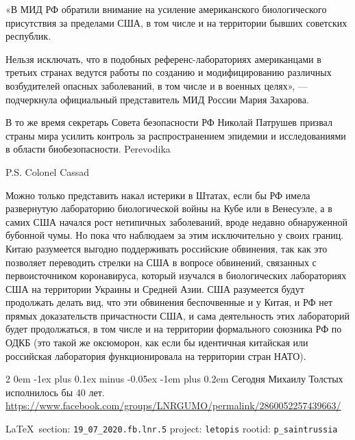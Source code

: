 \documentclass[a4paper,11pt]{extreport}
\makeatletter
\renewcommand\subsection{%
  \clearpage
    \@startsection{subsection}%
    {2}%
    {0em}%
    {-1ex plus 0.1ex minus -0.05ex}%
    {-1em plus 0.2em}%
    {\scshape\bfseries\Large}%
}
\makeatother
\begin{document}
«В МИД РФ обратили внимание на усиление американского биологического
присутствия за пределами США, в том числе и на территории бывших советских
республик.

Нельзя исключать, что в подобных референс-лабораториях американцами в третьих
странах ведутся работы по созданию и модифицированию различных возбудителей
опасных заболеваний, в том числе и в военных целях», --- подчеркнула официальный
представитель МИД России Мария Захарова.

В то же время секретарь Совета безопасности РФ Николай Патрушев призвал страны
мира усилить контроль за распространением эпидемии и исследованиями в области
биобезопасности.  Perevodika

P.S. Colonel Cassad

Можно только представить накал истерики в Штатах, если бы РФ имела развернутую
лабораторию биологической войны на Кубе или в Венесуэле, а в самих США начался
рост нетипичных заболеваний, вроде недавно обнаруженной бубонной чумы. Но пока
что наблюдаем за этим исключительно у своих границ.  Китаю разумеется выгодно
поддерживать российские обвинения, так как это позволяет переводить стрелки на
США в вопросе обвинений, связанных с первоисточником коронавируса, который
изучался в биологических лабораториях США на территории Украины и Средней Азии.
США разумеется будут продолжать делать вид, что эти обвинения беспочвенные и у
Китая, и РФ нет прямых доказательств причастности США, и сама деятельность этих
лабораторий будет продолжаться, в том числе и на территории формального
союзника РФ по ОДКБ (это такой же оксюморон, как если бы идентичная китайская
или российская лаборатория функционировала на территории стран НАТО).
  
 
 

\subsection{Сегодня Михаилу Толстых исполнилось бы 40 лет.}
\label{sec:19_07_2020.fb.lnr.5}
\url{https://www.facebook.com/groups/LNRGUMO/permalink/2860052257439663/}
  
\vspace{0.5cm}
{\small\LaTeX~section: \verb|19_07_2020.fb.lnr.5| project: \verb|letopis| rootid: \verb|p_saintrussia|}
\vspace{0.5cm}
\end{document}
